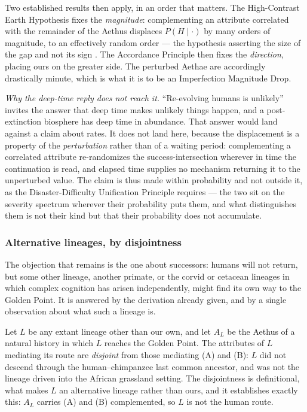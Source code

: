\begin{example}
Two established results then apply, in an order that matters. The
High-Contrast Earth Hypothesis fixes the \emph{magnitude}: complementing
an attribute correlated with the remainder of the Aethus displaces
$P(H\mid\cdot)$ by many orders of magnitude, to an effectively random
order --- the hypothesis asserting the size of the gap and not its sign
\cite{Nexus}. The Accordance Principle then fixes the \emph{direction},
placing ours on the greater side. The perturbed Aethae are accordingly
drastically minute, which is what it is to be an Imperfection Magnitude
Drop.

\emph{Why the deep-time reply does not reach it.} ``Re-evolving humans
is unlikely'' invites the answer that deep time makes unlikely things
happen, and a post-extinction biosphere has deep time in abundance. That
answer would land against a claim about rates. It does not land here,
because the displacement is a property of the \emph{perturbation} rather
than of a waiting period: complementing a correlated attribute
re-randomizes the success-intersection wherever in time the continuation
is read, and elapsed time supplies no mechanism returning it to the
unperturbed value. The claim is thus made within probability and not
outside it, as the Disaster-Difficulty Unification Principle requires
--- the two sit on the severity spectrum wherever their probability puts
them, and what distinguishes them is not their kind but that their
probability does not accumulate.

\subsubsection{Alternative lineages, by disjointness}
\label{gc:subsub:disjointness}

The objection that remains is the one about successors: humans will not
return, but some other lineage, another primate, or the corvid or
cetacean lineages in which complex cognition has arisen independently, might find its own way to the Golden Point. It is answered by the
derivation already given, and by a single observation about what such a
lineage is.

\begin{lemma}[Disjointness]\label{gc:prop:disjoint}
Let $L$ be any extant lineage other than our own, and let $A_L$ be the
Aethus of a natural history in which $L$ reaches the Golden Point. The
attributes of $L$ mediating its route are \emph{disjoint} from those
mediating (A) and (B): $L$ did not descend through the human--chimpanzee
last common ancestor, and was not the lineage driven into the African
grassland setting. The disjointness is definitional, what makes $L$ an
alternative lineage rather than ours, and it establishes exactly this:
$A_L$ carries (A) and (B) complemented, so $L$ is not the human route.
\end{lemma}


\end{example}
